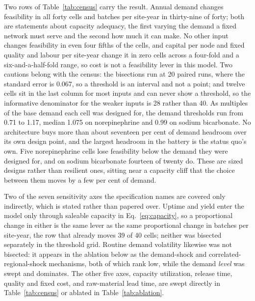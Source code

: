 Two rows of Table~\ref{tab:census} carry the result. Annual demand changes feasibility in all
forty cells and batches per site-year in thirty-nine of forty; both are statements about capacity
adequacy, the first varying the demand a fixed network must serve and the second how much it can
make. No other input changes feasibility in even four fifths of the cells, and capital per node
and fixed quality and labour per site-year change it in zero cells across a four-fold and a
six-and-a-half-fold range, so cost is not a feasibility lever in this model. Two cautions belong
with the census: the bisections run at 20 paired runs, where the standard error is 0.067, so a
threshold is an interval and not a point; and twelve cells sit in the last column for most inputs
and can never show a threshold, so the informative denominator for the weaker inputs is 28 rather
than 40. As multiples of the base demand each cell was designed for, the demand thresholds run
from 0.71 to 1.17, median 1.075 on norepinephrine and 0.99 on sodium bicarbonate. No architecture
buys more than about seventeen per cent of demand headroom over its own design point, and the
largest headroom in the battery is the status quo's own. Five norepinephrine cells lose
feasibility below the demand they were designed for, and on sodium bicarbonate fourteen of twenty
do. These are sized designs rather than resilient ones, sitting near a capacity cliff that the
choice between them moves by a few per cent of demand.

Two of the seven sensitivity axes the specification names are covered only indirectly, which is
stated rather than papered over. Uptime and yield enter the model only through saleable capacity
in Eq.~\ref{eq:capacity}, so a proportional change in either is the same lever as the same
proportional change in batches per site-year, the row that already moves 39 of 40 cells; neither
was bisected separately in the threshold grid. Routine demand volatility likewise was not
bisected: it appears in the ablation below as the demand-shock and correlated-regional-shock
mechanisms, both of which rank low, while the demand \emph{level} was swept and dominates. The
other five axes, capacity utilization, release time, quality and fixed cost, and raw-material lead
time, are swept directly in Table~\ref{tab:census} or ablated in Table~\ref{tab:ablation}.

